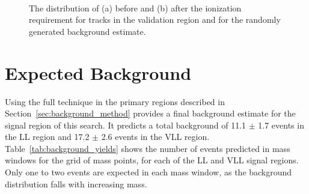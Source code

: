\begin{figure}[h]
\centering
{}
\\
\caption{The distribution of \mdedx (a) before and (b) after the ionization requirement for tracks in the validation region and for the randomly generated background estimate.}
\label{fig:validation_mass}
\end{figure}


\section{Expected Background}

Using the full technique in the primary regions described in Section~\ref{sec:background_method} provides a final background estimate for the signal region of this search.
It predicts a total background of 11.1 $\pm$ 1.7 events in the \ac{LL} region and 17.2 $\pm$ 2.6 events in the \ac{VLL} region.
Table~\ref{tab:background_yields} shows the number of events predicted in mass windows for the grid of mass points, for each of the \ac{LL} and \ac{VLL} signal regions.
Only one to two events are expected in each mass window, as the background distribution falls with increasing mass.

